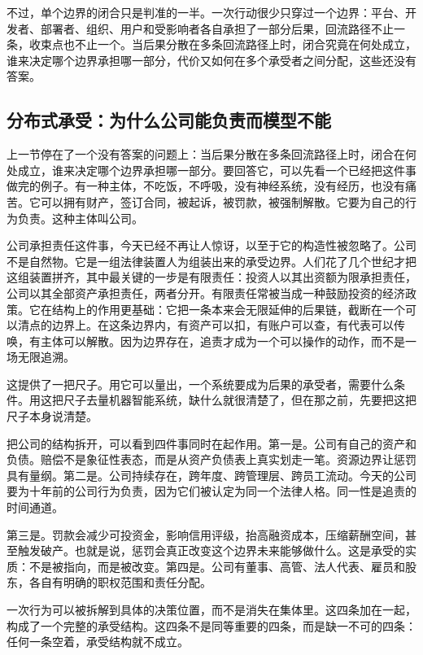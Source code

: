 不过，单个边界的闭合只是判准的一半。一次行动很少只穿过一个边界：平台、开发者、部署者、组织、用户和受影响者各自承担了一部分后果，回流路径不止一条，收束点也不止一个。当后果分散在多条回流路径上时，闭合究竟在何处成立，谁来决定哪个边界承担哪一部分，代价又如何在多个承受者之间分配，这些还没有答案。

\subsection{分布式承受：为什么公司能负责而模型不能}

上一节停在了一个没有答案的问题上：当后果分散在多条回流路径上时，闭合在何处成立，谁来决定哪个边界承担哪一部分。要回答它，可以先看一个已经把这件事做完的例子。有一种主体，不吃饭，不呼吸，没有神经系统，没有经历，也没有痛苦。它可以拥有财产，签订合同，被起诉，被罚款，被强制解散。它要为自己的行为负责。这种主体叫公司。


公司承担责任这件事，今天已经不再让人惊讶，以至于它的构造性被忽略了。公司不是自然物。它是一组法律装置人为组装出来的承受边界。人们花了几个世纪才把这组装置拼齐，其中最关键的一步是有限责任：投资人以其出资额为限承担责任，公司以其全部资产承担责任，两者分开。有限责任常被当成一种鼓励投资的经济政策。它在结构上的作用更基础：它把一条本来会无限延伸的后果链，截断在一个可以清点的边界上。在这条边界内，有资产可以扣，有账户可以查，有代表可以传唤，有主体可以解散。因为边界存在，追责才成为一个可以操作的动作，而不是一场无限追溯。

这提供了一把尺子。用它可以量出，一个系统要成为后果的承受者，需要什么条件。用这把尺子去量机器智能系统，缺什么就很清楚了，但在那之前，先要把这把尺子本身说清楚。


把公司的结构拆开，可以看到四件事同时在起作用。第一是。公司有自己的资产和负债。赔偿不是象征性表态，而是从资产负债表上真实划走一笔。资源边界让惩罚具有量纲。第二是。公司持续存在，跨年度、跨管理层、跨员工流动。今天的公司要为十年前的公司行为负责，因为它们被认定为同一个法律人格。同一性是追责的时间通道。

第三是。罚款会减少可投资金，影响信用评级，抬高融资成本，压缩薪酬空间，甚至触发破产。也就是说，惩罚会真正改变这个边界未来能够做什么。这是承受的实质：不是被指向，而是被改变。第四是。公司有董事、高管、法人代表、雇员和股东，各自有明确的职权范围和责任分配。

一次行为可以被拆解到具体的决策位置，而不是消失在集体里。这四条加在一起，构成了一个完整的承受结构。这四条不是同等重要的四条，而是缺一不可的四条：任何一条空着，承受结构就不成立。

